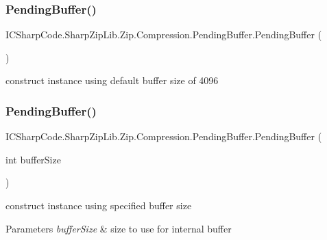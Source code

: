 \subsubsection{\texorpdfstring{Pending\+Buffer()}{PendingBuffer()}\hspace{0.1cm}{\footnotesize\ttfamily [3/4]}}
{\footnotesize\ttfamily I\+C\+Sharp\+Code.\+Sharp\+Zip\+Lib.\+Zip.\+Compression.\+Pending\+Buffer.\+Pending\+Buffer (\begin{DoxyParamCaption}{ }\end{DoxyParamCaption})\hspace{0.3cm}{\ttfamily [inline]}}



construct instance using default buffer size of 4096 

\mbox{\label{class_i_c_sharp_code_1_1_sharp_zip_lib_1_1_zip_1_1_compression_1_1_pending_buffer_a3097cb51b8024964380e603c82ced157}} 
\subsubsection{\texorpdfstring{Pending\+Buffer()}{PendingBuffer()}\hspace{0.1cm}{\footnotesize\ttfamily [4/4]}}
{\footnotesize\ttfamily I\+C\+Sharp\+Code.\+Sharp\+Zip\+Lib.\+Zip.\+Compression.\+Pending\+Buffer.\+Pending\+Buffer (\begin{DoxyParamCaption}\item[{int}]{buffer\+Size }\end{DoxyParamCaption})\hspace{0.3cm}{\ttfamily [inline]}}



construct instance using specified buffer size 


\begin{DoxyParams}{Parameters}
{\em buffer\+Size} & size to use for internal buffer \\
\hline
\end{DoxyParams}


